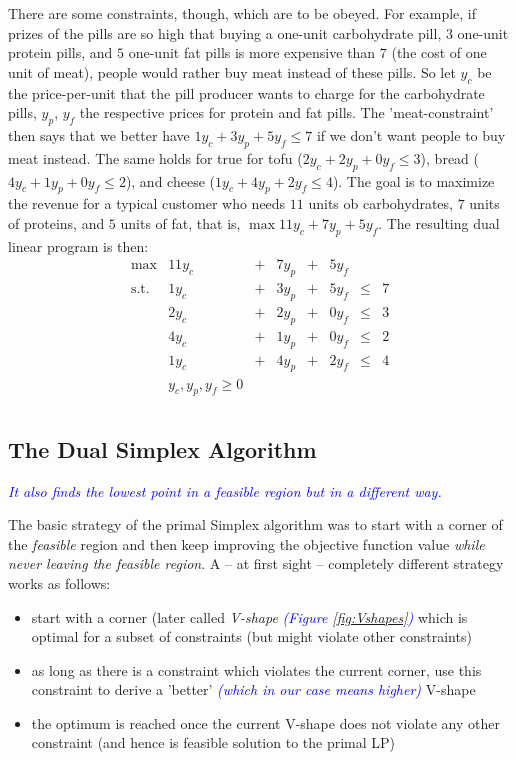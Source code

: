 \documentclass{article}
\begin{document}
There are some constraints, though, which are to be obeyed. For example, if prizes of the pills are so high that buying a one-unit carbohydrate pill, $3$ one-unit protein pills, and $5$ one-unit fat pills is more expensive than $7$ (the cost of one unit of meat), people would rather buy meat instead of these pills.
So let $y_c$ be the price-per-unit that the pill producer wants to charge for the carbohydrate pills, $y_p$, $y_f$ the respective prices for protein and fat pills. The 'meat-constraint' then says that we better have $1 y_c +  3 y_p + 5 y_f \leq 7$ if we don't want people to buy meat instead.
The same holds for true for tofu ($2 y_c + 2 y_p + 0 y_f \leq 3$), bread ($4y_c + 1 y_p +0y_f \leq 2$), and cheese ($1y_c+4y_p+2y_f\leq 4$). The goal is to maximize the revenue for a typical customer who needs $11$ units ob carbohydrates, $7$ units of proteins, and $5$ units of fat, that is, $\max 11y_c + 7y_p +5y_f$. The resulting dual linear program is then:
\[
\begin{matrix}
	\max	& 11 y_c	&+& 7 y_p&+& 5 y_f&&\\  
	\mbox{s.t.}	& 1 y_c &+& 3 y_p&+& 5 y_f&\leq&7\\
			&2 y_c &+& 2 y_p &+& 0 y_f & \leq &3\\
			&4 y_c &+& 1 y_p &+& 0 y_f & \leq &2\\
			&1 y_c &+& 4 y_p &+& 2 y_f & \leq &4\\
			& y_c, y_p, y_f\geq 0\\
\end{matrix}
\]


\subsection{The Dual Simplex Algorithm}

\textcolor{blue}{\emph{It also finds the lowest point in a feasible region but in a different way.}}

The basic strategy of the primal Simplex algorithm was to start with a corner of the \emph{feasible} region and then keep improving the objective function value \emph{while never leaving the feasible region}. A -- at first sight -- completely different strategy works as follows:
\begin{itemize}
\item start with a corner (later called \emph{V-shape} \textcolor{blue}{\emph{(Figure \ref{fig:Vshapes})}} which is optimal for a subset of constraints (but might violate other constraints)
\item as long as there is a constraint which violates the current corner, use this constraint to derive a 'better' \textcolor{blue}{\emph{(which in our case means higher)}} V-shape
\item the optimum is reached once the current V-shape does not violate any other constraint (and hence is feasible solution to the primal LP)
\end{itemize}
\end{document}
